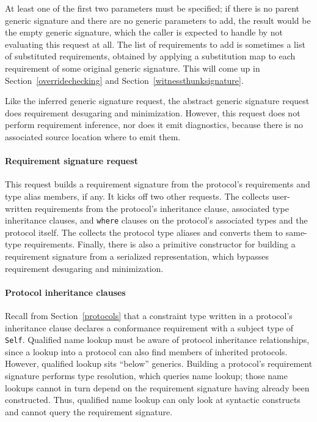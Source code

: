 \documentclass[../generics]{subfiles}
\begin{document}
At least one of the first two parameters must be specified; if there is no parent generic signature and there are no generic parameters to add, the result would be the empty generic signature, which the caller is expected to handle by not evaluating this request at all. The list of requirements to add is sometimes a list of substituted requirements, obtained by applying a substitution map to each requirement of some original generic signature. This will come up in Section~\ref{overridechecking} and Section~\ref{witnessthunksignature}.

%
Like the inferred generic signature request, the abstract generic signature request does requirement desugaring and minimization. However, this request does not perform requirement inference, nor does it emit diagnostics, because there is no associated source location where to emit them.

\paragraph{Requirement signature request}
%
%
%
%
%
%
%
%
%
This request builds a requirement signature from the protocol's requirements and type alias members, if any. It kicks off two other requests. The  collects user-written requirements from the protocol’s inheritance clause, associated type inheritance clauses, and \texttt{where} clauses on the protocol’s associated types and the protocol itself. The  collects the protocol type aliases and converts them to same-type requirements. Finally, there is also a primitive constructor for building a requirement signature from a serialized representation, which bypasses requirement desugaring and minimization.

\paragraph{Protocol inheritance clauses}
Recall from Section~\ref{protocols} that a constraint type written in a protocol's inheritance clause declares a conformance requirement with a subject type of \texttt{Self}. Qualified name lookup must be aware of protocol inheritance relationships, since a lookup into a protocol can also find members of inherited protocols. However, qualified lookup sits ``below'' generics. Building a protocol's requirement signature performs type resolution, which queries name lookup; those name lookups cannot in turn depend on the requirement signature having already been constructed. Thus, qualified name lookup can only look at syntactic constructs and cannot query the requirement signature.
\end{document}
